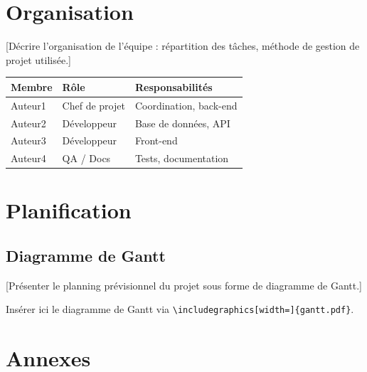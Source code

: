 \documentclass[12pt, a4paper]{article}
\begin{document}
\section{Organisation}

[Décrire l'organisation de l'équipe : répartition des tâches, méthode de
gestion de projet utilisée.]

\begin{center}
\begin{tabular}{|l|l|l|}
  \hline
  \rowcolor{tabhead}
  \color{white}\textbf{Membre} &
  \color{white}\textbf{Rôle} &
  \color{white}\textbf{Responsabilités} \\
  \hline
  Auteur1 & Chef de projet & Coordination, back-end \\
  \hline
  Auteur2 & Développeur    & Base de données, API \\
  \hline
  Auteur3 & Développeur    & Front-end \\
  \hline
  Auteur4 & QA / Docs      & Tests, documentation \\
  \hline
\end{tabular}
\end{center}

\section{Planification}

\subsection{Diagramme de Gantt}

[Présenter le planning prévisionnel du projet sous forme de diagramme de Gantt.]

\begin{remarque}
  Insérer ici le diagramme de Gantt via
  \texttt{\textbackslash includegraphics[width=\textwidth]\{gantt.pdf\}}.
\end{remarque}

\section{Annexes}
\end{document}
